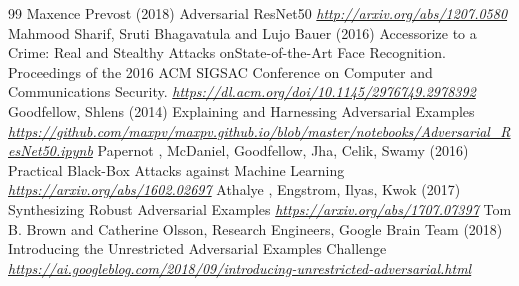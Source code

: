 \documentclass[11pt,compress,t,notes=noshow, xcolor=table]{beamer}
\begin{document}
\begin{vbframe}
{\begin{thebibliography}{99}
 Maxence Prevost (2018)
\newblock Adversarial ResNet50 
\newblock \emph{\url{http://arxiv.org/abs/1207.0580}}
 Mahmood Sharif, Sruti  Bhagavatula and Lujo Bauer (2016)
\newblock Accessorize to a Crime: Real and Stealthy Attacks onState-of-the-Art Face Recognition. Proceedings of the 2016 ACM SIGSAC Conference on Computer and Communications Security.
\newblock \emph{\url{https://dl.acm.org/doi/10.1145/2976749.2978392}}
 Goodfellow, Shlens (2014)
\newblock Explaining and Harnessing Adversarial Examples
\newblock \emph{\url{https://github.com/maxpv/maxpv.github.io/blob/master/notebooks/Adversarial_ResNet50.ipynb}}
 Papernot , McDaniel, Goodfellow, Jha, Celik, Swamy (2016)
\newblock Practical Black-Box Attacks against Machine Learning
\newblock \emph{\url{https://arxiv.org/abs/1602.02697}}
 Athalye , Engstrom, Ilyas, Kwok (2017)
\newblock Synthesizing Robust Adversarial Examples
\newblock \emph{\url{https://arxiv.org/abs/1707.07397}}
 Tom B. Brown and Catherine Olsson, Research Engineers, Google Brain Team (2018)
\newblock 
Introducing the Unrestricted Adversarial Examples Challenge 
\newblock \emph{\url{https://ai.googleblog.com/2018/09/introducing-unrestricted-adversarial.html}}
\end{thebibliography}
}
\end{vbframe}
\endlecture
\end{document}
